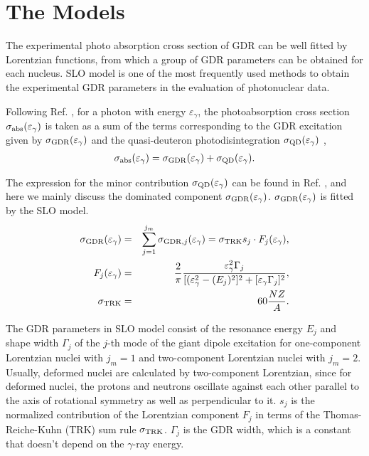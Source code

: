 \documentclass[twocolumn,showpacs,superscriptaddress,amsmath,amssymb,prc,preprintnumbers]{revtex4-1}
\begin{document}
\section{The Models}

The experimental photo absorption cross section of GDR can be well fitted by Lorentzian functions, from which a group of GDR parameters can be obtained for each nucleus. SLO \cite{DMBrink195501, Axel1962} model is one of the most frequently used methods to obtain the experimental GDR parameters in the evaluation of photonuclear data.

Following Ref. \cite{Plujko2018}, for a photon with energy $\varepsilon_{\gamma}$, the photoabsorption cross section $\sigma_{\rm abs}(\varepsilon_{\gamma}) $ is taken as a sum of the terms corresponding to the GDR excitation given by $\sigma_{\rm GDR}(\varepsilon_{\gamma})$ and the quasi-deuteron photodisintegration $\sigma_{\rm QD}(\varepsilon_{\gamma})$ \cite{Chadwick2000, Chadwick1991},
\begin{align}
\sigma_{\rm abs}(\varepsilon_{\gamma}) = \sigma_{\rm GDR}(\varepsilon_{\gamma}) + \sigma_{\rm QD}(\varepsilon_{\gamma}).
\end{align}

The expression for the minor contribution $\sigma_{\rm QD}(\varepsilon_{\gamma})$ can be found in Ref. \cite{Plujko2018}, and here we mainly discuss the dominated component $\sigma_{\rm GDR}(\varepsilon_{\gamma})$.
$\sigma_{\rm GDR}(\varepsilon_{\gamma})$ is fitted by the SLO model.
\begin{eqnarray}
\sigma_{\rm GDR}(\varepsilon_{\gamma}) & = & \sum_{j=1}^{j_m} \sigma_{{\rm GDR}, j}(\varepsilon_{\gamma})  = \sigma_{\rm TRK} s_j \cdot F_j(\varepsilon_{\gamma}),\\
F_j(\varepsilon_{\gamma}) &= & \frac {2}{\pi} \frac{\varepsilon_{\gamma}^2\Gamma_j}{[(\varepsilon_{\gamma}^2-(E_{j})^2]^2+[\varepsilon_{\gamma}\Gamma_j]^2} , \\
\sigma_{\rm TRK} &= & 60 \frac {NZ}{A}.
\end{eqnarray}

The GDR parameters in SLO model consist of the resonance energy $E_{j}$ and shape width $\Gamma_{j}$ of the $j$-th mode of the giant dipole excitation
for one-component Lorentzian nuclei with $j_m = 1$ and two-component Lorentzian nuclei with $j_m = 2$. Usually, deformed nuclei are calculated by two-component Lorentzian, since for deformed nuclei, the protons and neutrons oscillate against each other parallel to the axis of rotational symmetry as well as perpendicular to it.
$s_j $ is the normalized contribution of the Lorentzian component $F_j $ in terms of the Thomas-Reiche-Kuhn (TRK) sum rule $\sigma_{\rm TRK}$.
 $\Gamma_j  $ is the GDR width, which is a constant that doesn't depend on the $\gamma$-ray energy.
\end{document}
